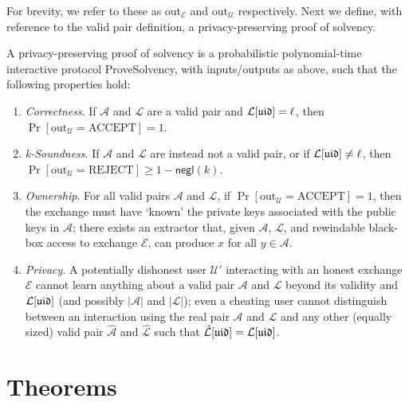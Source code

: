 For brevity, we refer to these as $\text{out}_{\mathcal{E}}$ and $\text{out}_{\mathcal{U}}$ respectively. Next we define, with reference to the valid pair definition, a privacy-preserving proof of solvency.

\begin{definition}
\label{def:2} A privacy-preserving proof of solvency is a probabilistic polynomial-time interactive protocol ProveSolvency, with inputs/outputs as above, such that the following properties hold:

\begin{enumerate}
\item \textit{Correctness}. If $\mathcal{A}$ and $\mathcal{L}$ are a valid pair and $\mathcal{L}[\mathfrak{uid}] = \ell$, then $\Pr[\text{out}_{\mathcal{U}} = \text{ACCEPT}] = 1$.
\item \textit{k-Soundness}. If $\mathcal{A}$ and $\mathcal{L}$ are instead not a valid pair, or if $\mathcal{L}[\mathfrak{uid}] \neq \ell$, then $\Pr[\text{out}_{\mathcal{U}} = \text{REJECT}] \geq 1 - \mathsf{negl}(k)$.
\item \textit{Ownership}. For all valid pairs $\mathcal{A}$ and $\mathcal{L}$, if $\Pr[\text{out}_{\mathcal{U}} = \text{ACCEPT}] = 1$, then the exchange must have ‘known’ the private keys associated with the public keys in $\mathcal{A}$; \ie there exists an extractor that, given $\mathcal{A}$, $\mathcal{L}$, and rewindable black-box access to exchange $\mathcal{E}$, can produce $x$ for all $y \in \mathcal{A}$.
\item \textit{Privacy}. A potentially dishonest user $\mathcal{U}'$ interacting with an honest exchange $\mathcal{E}$ cannot learn anything about a valid pair $\mathcal{A}$ and $\mathcal{L}$ beyond its validity and $\mathcal{L}[\mathfrak{uid}]$ (and possibly $|\mathcal{A}|$ and $|\mathcal{L}|$); \ie even a cheating user cannot distinguish between an interaction using the real pair $\mathcal{A}$ and $\mathcal{L}$ and any other (equally sized) valid pair $\hat{\mathcal{A}}$ and $\hat{\mathcal{L}}$ such that $\hat{\mathcal{L}}[\mathfrak{uid}] = \mathcal{L}[\mathfrak{uid}]$.
\end{enumerate}
\end{definition}

\section{Theorems}


